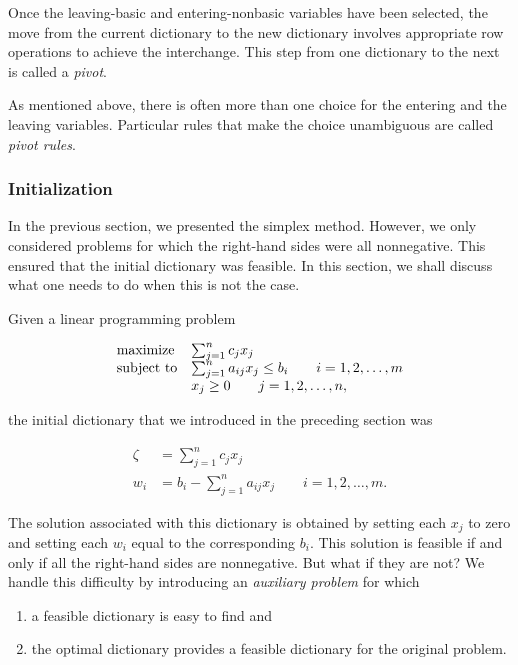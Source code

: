 \documentclass{article}
\begin{document}
    Once the leaving-basic and entering-nonbasic variables have been selected, the move from the current dictionary to the new dictionary involves appropriate row operations to achieve the interchange. This step from one dictionary to the next is called a \emph{pivot}.
    
    As mentioned above, there is often more than one choice for the entering and the leaving variables. Particular rules that make the choice unambiguous are called \emph{pivot rules}.
    
    \subsubsection{Initialization}
    
    In the previous section, we presented the simplex method. However, we only considered problems for which the right-hand sides were all nonnegative. This ensured that the initial dictionary was feasible. In this section, we shall discuss what one needs to do when this is not the case.
    
    Given a linear programming problem
    
    \[
    \begin{array}[]{ll}
    \text{maximize} & \sum_{j=1}^{n}c_{j}x_{j} \\
    \text{subject to} & \sum_{j=1}^{n}a_{ij}x_{j} \leq b_{i} \qquad i=1,2,\ldots,m \\
    & x_{j} \geq 0 \qquad j=1,2,\ldots,n,
    \end{array}
    \]
    
    the initial dictionary that we introduced in the preceding section was
    
    \[
    \begin{split}
    \zeta &= \sum_{j=1}^{n}c_{j}x_{j} \\
    w_{i} &= b_{i} - \sum_{j=1}^{n}a_{ij}x_{j} \qquad i=1,2,\ldots,m.
    \end{split}
    \]
    
    The solution associated with this dictionary is obtained by setting each \( x_{j} \) to zero and setting each \( w_{i} \) equal to the corresponding \( b_{i} \). This solution is feasible if and only if all the right-hand sides are nonnegative. But what if they are not? We handle this difficulty by introducing an \emph{auxiliary problem} for which
    
    \begin{enumerate}
    \item a feasible dictionary is easy to find and
    \item the optimal dictionary provides a feasible dictionary for the original problem.
    \end{enumerate}
\end{document}
